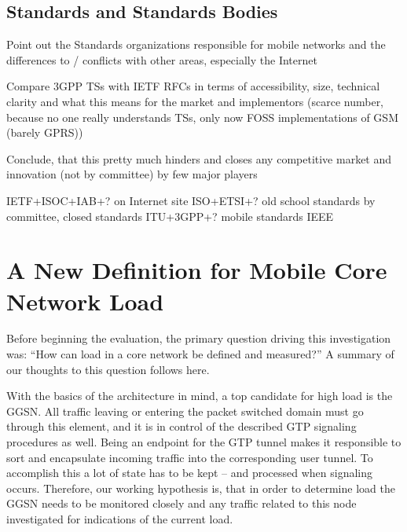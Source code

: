 \subsection{Standards and Standards Bodies}

Point out the Standards organizations responsible for mobile networks and the differences to / conflicts with other areas, especially the Internet

Compare \gls{3GPP} \glspl{TS} with \gls{IETF} \glspl{RFC} in terms of accessibility, size, technical clarity and what this means for the market and implementors (scarce number, because no one really understands TSs, only now \gls{FOSS} implementations of \gls{GSM} (barely \gls{GPRS}))

Conclude, that this pretty much hinders and closes any competitive market and innovation (not by committee) by few major players

\gls{IETF}+\gls{ISOC}+\gls{IAB}+? on Internet site
\gls{ISO}+\gls{ETSI}+? old school standards by committee, closed standards
\gls{ITU}+\gls{3GPP}+? mobile standards
\gls{IEEE}











\section{A New Definition for Mobile Core Network Load}
\label{c4:loaddefinition}

Before beginning the evaluation, the primary question driving this investigation was: ``How can load in a core network be defined and measured?'' A summary of our thoughts to this question follows here.

With the basics of the architecture in mind, a top candidate for high load is the \gls{GGSN}. All traffic leaving or entering the packet switched domain must go through this element, and it is in control of the described GTP signaling procedures as well. Being an endpoint for the GTP tunnel makes it responsible to sort and encapsulate incoming traffic into the corresponding user tunnel. To accomplish this a lot of state has to be kept -- and processed when signaling occurs. Therefore, our working hypothesis is, that in order to determine load the \gls{GGSN} needs to be monitored closely and any traffic related to this node investigated for indications of the current load.

